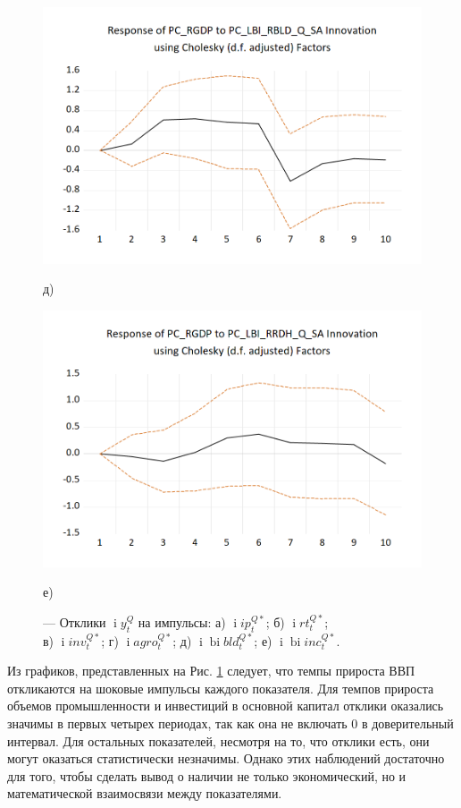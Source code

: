 \documentclass[a4paper, 14pt]{extreport}
\numberwithin{equation}{section}
\renewcommand{\i}{\operatorname{i}}
\newcommand{\bi}{\operatorname{bi}}
\numberwithin{equation}{section}
\begin{document}
\begin{figure}[h!]
		\begin{minipage}{0.5\textwidth}
			\centering
			\includegraphics[scale=0.4]{images/image39}
			\caption*{д)}
		\end{minipage}%
		\hfill %
		\begin{minipage}{0.5\textwidth}
			\centering
			\includegraphics[scale=0.4]{images/image40}
			\caption*{е)}
		\end{minipage}
		
		\caption{\centering --- Отклики $\i y_t^Q$ на импульсы: а) $\i ip_t^{Q*}$; б) $\i rt_t^{Q*}$;\\ в) $\i inv_t^{Q*}$; г) $\i agro_t^{Q*}$; д) $\i \bi bld_t^{Q*}$; е) $\i \bi inc_t^{Q*}$.}
		\label{fig:irf-2}
	\end{figure}

	Из графиков, представленных на Рис. \ref{fig:irf-2} следует, что темпы прироста ВВП откликаются на шоковые импульсы каждого показателя. Для темпов прироста объемов промышленности и инвестиций в основной капитал отклики оказались значимы в первых четырех периодах, так как она не включать 0 в доверительный интервал. Для остальных показателей, несмотря на то, что отклики есть, они могут оказаться статистически незначимы.
	Однако этих наблюдений достаточно для того, чтобы сделать вывод о наличии не только экономический, но и математической взаимосвязи между показателями.
	
\end{document}
